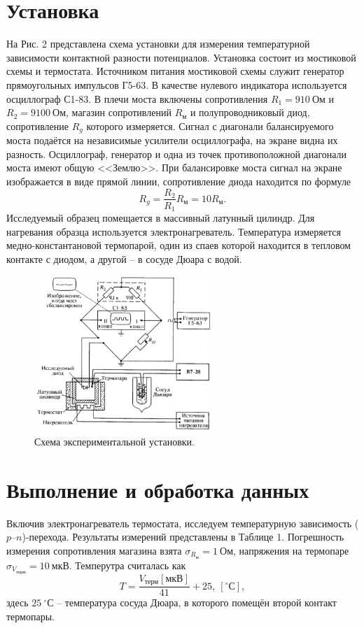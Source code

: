 \documentclass[a4paper,12pt]{article}
\theoremstyle{definition}
\begin{document}
\section*{Установка}
На Рис. 2 представлена схема установки для измерения температурной зависимости контактной разности потенциалов. Установка состоит из мостиковой схемы и термостата. Источником питания мостиковой схемы служит генератор прямоугольных импульсов Г5-63. В качестве нулевого индикатора используется осциллограф С1-83. В плечи моста включены сопротивления $R_1 = 910~\text{Ом} $ и $R_2 = 9100~\text{Ом}$, магазин сопротивлений $R_\text{м}$ и полупроводниковый диод, сопротивление $R_g$ которого измеряется. Сигнал с диагонали балансируемого моста подаётся на независимые усилители осциллографа, на экране видна их разность. Осциллограф, генератор и одна из точек противоположной диагонали моста имеют общую <<Землю>>. При балансировке моста сигнал на экране изображается в виде прямой линии, сопротивление диода находится по формуле
\[R_g = \dfrac{R_2}{R_1}R_\text{м} = 10R_\text{м}.\]
Исследуемый образец помещается в массивный латунный цилиндр. Для нагревания образца используется электронагреватель. Температура измеряется медно-константановой термопарой, один из спаев которой находится в тепловом контакте с диодом, а другой -- в сосуде Дюара с водой.
\begin{figure}[h]
\includegraphics[width = 0.6\textwidth]{2.png}
\centering
\caption{Схема экспериментальной установки.}
\end{figure}


\section*{Выполнение и обработка данных}
Включив электронагреватель термостата, исследуем температурную зависимость ($p$--$n$)-перехода. Результаты измерений представлены в Таблице 1. Погрешность измерения сопротивления магазина взята $\sigma_{R_\text{м}} = 1~\text{Ом}$, напряжения на термопаре $\sigma_{V_{\text{терм}}} = 10~\text{мкВ}$. Темперутра считалась как 
\[T = \dfrac{V_{\text{терм}}[\text{мкВ}]}{41} + 25,~[^\circ \text{С}],\]
здесь $25~^\circ \text{С}$ -- температура сосуда Дюара, в которого помещён второй контакт термопары.
\end{document}
